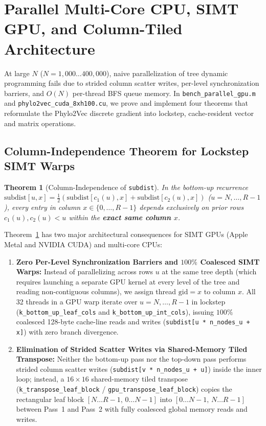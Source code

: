 \documentclass[11pt,a4paper]{article}
\newtheorem{theorem}{Theorem}[section]
\theoremstyle{definition}
\begin{document}
\section{Parallel Multi-Core CPU, SIMT GPU, and Column-Tiled Architecture}
\label{sec:parallel}

At large $N$ ($N = 1{,}000 \dots 400{,}000$), naive parallelization of tree dynamic programming fails due to strided column scatter writes, per-level synchronization barriers, and $O(N)$ per-thread BFS queue memory. In \texttt{bench\_parallel\_gpu.m} and \texttt{phylo2vec\_cuda\_8xh100.cu}, we prove and implement four theorems that reformulate the Phylo2Vec discrete gradient into lockstep, cache-resident vector and matrix operations.

\subsection{Column-Independence Theorem for Lockstep SIMT Warps}

\begin{theorem}[Column-Independence of \texttt{subdist}]
\label{thm:col_indep}
In the bottom-up recurrence $\text{subdist}[u, x] = \frac{1}{2}(\text{subdist}[c_1(u), x] + \text{subdist}[c_2(u), x])$ ($u = N, \dots, R-1$), every entry in column $x \in \{0, \dots, R-1\}$ depends exclusively on prior rows $c_1(u), c_2(u) < u$ within the \textbf{exact same column $x$}.
\end{theorem}

Theorem~\ref{thm:col_indep} has two major architectural consequences for SIMT GPUs (Apple Metal and NVIDIA CUDA) and multi-core CPUs:
\begin{enumerate}
    \item \textbf{Zero Per-Level Synchronization Barriers and $100\%$ Coalesced SIMT Warps:} Instead of parallelizing across rows $u$ at the same tree depth (which requires launching a separate GPU kernel at every level of the tree and reading non-contiguous columns), we assign thread $\text{gid} = x$ to column $x$. All 32 threads in a GPU warp iterate over $u = N, \dots, R-1$ in lockstep (\texttt{k\_bottom\_up\_leaf\_cols} and \texttt{k\_bottom\_up\_int\_cols}), issuing $100\%$ coalesced 128-byte cache-line reads and writes (\texttt{subdist[u * n\_nodes\_u + x]}) with zero branch divergence.
    \item \textbf{Elimination of Strided Scatter Writes via Shared-Memory Tiled Transpose:} Neither the bottom-up pass nor the top-down pass performs strided column scatter writes (\texttt{subdist[v * n\_nodes\_u + u]}) inside the inner loop; instead, a $16 \times 16$ shared-memory tiled transpose (\texttt{k\_transpose\_leaf\_block} / \texttt{gpu\_transpose\_leaf\_block}) copies the rectangular leaf block $[N \dots R-1, \, 0 \dots N-1]$ into $[0 \dots N-1, \, N \dots R-1]$ between Pass~1 and Pass~2 with fully coalesced global memory reads and writes.
\end{enumerate}
\end{document}
